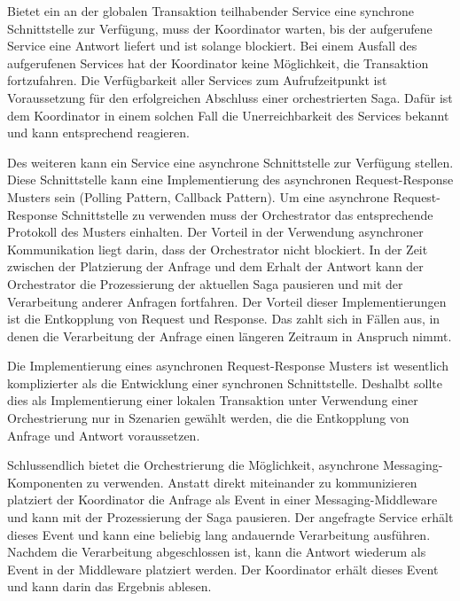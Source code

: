 Bietet ein an der globalen Transaktion teilhabender Service eine synchrone Schnittstelle zur Verfügung, muss der Koordinator warten, bis der aufgerufene Service eine Antwort liefert und ist solange blockiert. Bei einem Ausfall des aufgerufenen Services hat der Koordinator keine Möglichkeit, die Transaktion fortzufahren. Die Verfügbarkeit aller Services zum Aufrufzeitpunkt ist Voraussetzung für den erfolgreichen Abschluss einer orchestrierten Saga. Dafür ist dem Koordinator in einem solchen Fall die Unerreichbarkeit des Services bekannt und kann entsprechend reagieren. 

Des weiteren kann ein Service eine asynchrone Schnittstelle zur Verfügung stellen. Diese Schnittstelle kann eine Implementierung des asynchronen Request-Response Musters sein (Polling Pattern, Callback Pattern). Um eine asynchrone Request-Response Schnittstelle zu verwenden muss der Orchestrator das entsprechende Protokoll des Musters einhalten. Der Vorteil in der Verwendung asynchroner Kommunikation liegt darin, dass der Orchestrator nicht blockiert. In der Zeit zwischen der Platzierung der Anfrage und dem Erhalt der Antwort kann der Orchestrator die Prozessierung der aktuellen Saga pausieren und mit der Verarbeitung anderer Anfragen fortfahren. Der Vorteil dieser Implementierungen ist die Entkopplung von Request und Response. Das zahlt sich in Fällen aus, in denen die Verarbeitung der Anfrage einen längeren Zeitraum in Anspruch nimmt.  

Die Implementierung eines asynchronen Request-Response Musters ist wesentlich komplizierter als die Entwicklung einer synchronen Schnittstelle. Deshalbt sollte dies als Implementierung einer lokalen Transaktion unter Verwendung einer Orchestrierung nur in Szenarien gewählt werden, die die Entkopplung von Anfrage und Antwort voraussetzen.

Schlussendlich bietet die Orchestrierung die Möglichkeit, asynchrone Messaging-Komponenten zu verwenden. Anstatt direkt miteinander zu kommunizieren platziert der Koordinator die Anfrage als Event in einer Messaging-Middleware und kann mit der Prozessierung der Saga pausieren. Der angefragte Service erhält dieses Event und kann eine beliebig lang andauernde Verarbeitung ausführen. Nachdem die Verarbeitung abgeschlossen ist, kann die Antwort wiederum als Event in der Middleware platziert werden. Der Koordinator erhält dieses Event und kann darin das Ergebnis ablesen.

